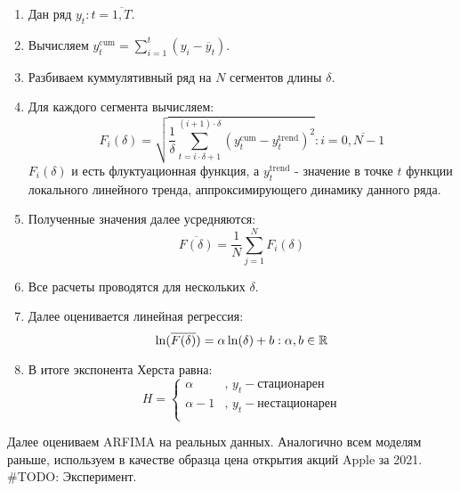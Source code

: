 \begin{enumerate}
	\item Дан ряд $y_t: t = \overline{1, T}$.
	\item Вычисляем $y^{\text{cum}}_t = \sum_{i = 1}^t (y_i - \overline{y}_t)$.
	\item Разбиваем куммулятивный ряд на $N$ сегментов длины $\delta$.
	\item Для каждого сегмента вычисляем:
	\begin{equation}
		F_i(\delta) = \sqrt{\frac{1}{\delta} \sum_{t = i \cdot \delta + 1}^{(i + 1) \cdot \delta} \left(y_t^{\text{cum}} - y^{\text{trend}}_t \right)^2}: i = \overline{0, N - 1}
	\end{equation}
	$F_i(\delta)$ и есть флуктуационная функция, а $y^{\text{trend}}_t$ - значение в точке $t$ функции локального линейного тренда, аппроксимирующего динамику данного ряда.
	\item Полученные значения далее усредняются:
	\begin{equation}
		\overline{F(\delta)} = \frac{1}{N}\sum_{j = 1}^N F_i(\delta)
	\end{equation}
	\item Все расчеты проводятся для нескольких $\delta$.
	\item Далее оценивается линейная регрессия:
	\begin{equation}
		\ln(\overline{F(\delta)}) = \alpha \ln(\delta) + b: \alpha, b \in \mathbb{R}
	\end{equation}
	\item В итоге экспонента Херста равна:
	\begin{equation}
		H = \left\{\begin{array}{rl}
			\alpha & \text{, } y_t - \text{стационарен}\\
			\alpha - 1 & \text{, } y_t - \text{нестационарен}\\
		\end{array}\right.
	\end{equation}
\end{enumerate}

\noindent Далее оцениваем ARFIMA на реальных данных. Аналогично всем моделям раньше, используем в качестве образца цена открытия акций Apple за 2021.\\

\#TODO: Эксперимент.